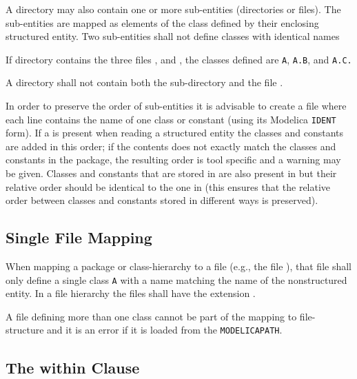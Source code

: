 A directory may also contain one or more sub-entities (directories or files).
The sub-entities are mapped as elements of the class defined by their enclosing structured entity.
Two sub-entities shall not define classes with identical names

\begin{example}
If directory  contains the three files ,  and , the classes defined are \lstinline!A!,
\lstinline!A.B!, and \lstinline!A.C.!
\end{example}

\begin{example}
A directory shall not contain both the sub-directory  and the file .
\end{example}

In order to preserve the order of sub-entities it is advisable to create a file  where each line contains the name of one class or constant (using its Modelica \lstinline!IDENT! form).
If a  is present when reading a structured entity the classes and constants are added in this order; if the contents does not exactly match the classes and constants in the package, the resulting order is tool specific and a warning may be given.
Classes and constants that are stored in  are also present in  but their relative order should be identical to the one in  (this ensures that the relative order between classes and constants stored in different ways is preserved).


\subsection{Single File Mapping}\label{mapping-a-package-class-hierarchy-into-a-single-file-nonstructured-entity}\label{single-file-mapping}

When mapping a package or class-hierarchy to a file (e.g., the file ), that file shall only define a single class \lstinline!A! with a name matching the name of the nonstructured entity.
In a file hierarchy the files shall have the extension .

A  file defining more than one class cannot be part of the mapping
to file-structure and it is an error if it is loaded from the
\lstinline!MODELICAPATH!.


\subsection{The within Clause}\label{the-within-clause}

